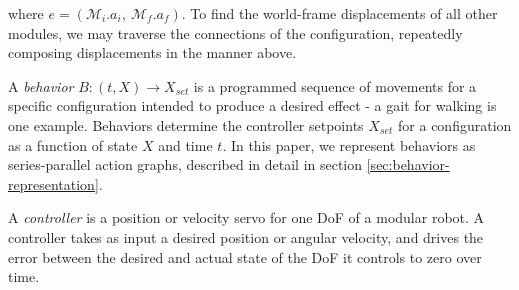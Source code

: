 \documentclass[graybox]{svmult}
\begin{document}
\begin{definition}[Configuration]
where \(e=(\mathcal{M}_i.a_i,~\mathcal{M}_f.a_f)\). To find the world-frame displacements
of all other modules, we may traverse the connections of the configuration,  repeatedly
composing displacements in the manner above. 
\end{definition}



\begin{definition}[Behavior]\label{def:behavior}
A \textit{behavior} \(B:(t,X)\to X_{set}\) is a programmed sequence of movements for a specific configuration
intended to produce a desired effect - a gait for walking is one example.  Behaviors
determine the controller setpoints \(X_{set}\) for a configuration as a function
of state \(X\) and time \(t\). In this paper, we represent behaviors as
series-parallel action graphs, described in detail in section
\ref{sec:behavior-representation}.
\end{definition}
\begin{definition}[Controller]
A \textit{controller} is a position or velocity servo for one DoF of a modular
robot.  A controller takes as input a desired position or angular velocity, and
drives the error between the desired and actual state of the DoF it controls to
zero over time.
\end{definition}
\end{document}
